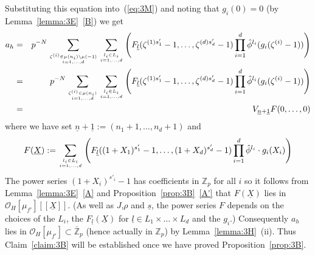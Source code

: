 \documentclass[12pt]{article}
\newcounter{rem}[section]%
\newcommand{\bbZ}{\ensuremath{\mathbb{Z}}}
\newcommand{\beql}[1]{\begin{equation}\label{#1}}
\newcommand{\cO}{\ensuremath{\mathcal{O}}}
\newcommand{\eeq}{\end{equation}}
\newcommand{\refeq}[1]{~(\ref{eq:#1})}
\newcommand{\rem}{\refstepcounter{rem}\noindent{\sc Remark \therem}}%
\renewcommand{\therem}{\thesection.\arabic{rem}}
\newcommand{\ul}{\ensuremath{{\underline{l}}}}
\newcommand{\un}{\ensuremath{{\underline{n}}}}
\newcommand{\uo}{\ensuremath{{\underline{1}}}}
\newcommand{\uX}{\ensuremath{{\underline{X}}}}
\begin{document}
Substituting  this equation into\refeq{3M} and noting that $g_i(0)=0$ (by
Lemma~\ref{lemma:3E}~\ref{B}) we get
\begin{eqnarray}
a_h&=&p^{-N}
\sum_{\zeta^{(i)}\in\mu(n_i)\setminus\mu(-1)\atop i=1,\ldots,d}
\sum_{l_i\in L_i\atop i=1,\ldots,d}
\left(
F_{\ul}( \zeta^{(1)s'_1}-1,\ldots,
\zeta^{(d)s'_d}-1)
\prod_{i=1}^d\hat{\phi}^{l_i}(g_i(\zeta^{(i)}-1))
\right)\nonumber\\
  &=&p^{-N}\sum_{\zeta^{(i)}\in\mu(n_i)\atop i=1,\ldots,d}
\sum_{l_i\in L_i\atop i=1,\ldots,d}
\left(
F_{\ul}( \zeta^{(1)s'_1}-1,\ldots,
\zeta^{(d)s'_d}-1)
\prod_{i=1}^d\hat{\phi}^{l_i}(g_i(\zeta^{(i)}-1))
\right)\nonumber\\
  &=&
V_{\un+\uo}F(0,\ldots,0)\label{eq:3S.2}
\end{eqnarray}
where we have set $\un+\uo:=(n_1+1,\ldots,n_d+1)$ and
\beql{eq:3S.3}
F(\uX):=\sum_{l_i\in L_i\atop i=1,\ldots,d}
\left(
F_{\ul}((1+X_1)^{s'_1}-1,\ldots,(1+X_d)^{s'_d}-1 )
\prod_{i=1}^d\hat{\phi}^{l_i}\cdot g_i(X_i)
\right)
\eeq
The power series $(1+X_i)^{s'_i}-1$ has coefficients in
$\bbZ_p$ for all $i$ so it follows from Lemma~\ref{lemma:3E}~\ref{A}
and Proposition~\ref{prop:3B}~\ref{A'} that $F(\uX)$ lies in
$\cO_H[\mu_{f'}][[\uX]]$. (As well as $J$,$\rho$ and $\underline{s}$, the
power series $F$ depends on the choices of the $L_i$, the
$F_\ul(\uX)$ for $\ul\in L_1\times\ldots\times L_d$ and the $g_i$.)
Consequently $a_h$ lies in $\cO_H[\mu_{f'}]\subset\bar{\bbZ}_p$
(hence actually in $\bbZ_p$) by
Lemma~\ref{lemma:3H}~(ii).
Thus Claim~\ref{claim:3B} will be established once we have
proved Proposition~\ref{prop:3B}.
\end{document}
